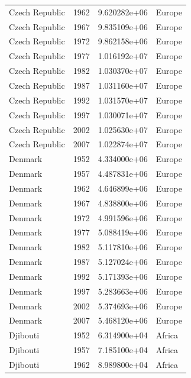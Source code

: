\documentclass[
  letterpaper,
  DIV=11,
  numbers=noendperiod]{scrreprt}
\begin{document}
\begin{tcolorbox}
\begin{tabular}{lrrl}
Czech Republic           &  1962 &  9.620282e+06 &    Europe \\
Czech Republic           &  1967 &  9.835109e+06 &    Europe \\
Czech Republic           &  1972 &  9.862158e+06 &    Europe \\
Czech Republic           &  1977 &  1.016192e+07 &    Europe \\
Czech Republic           &  1982 &  1.030370e+07 &    Europe \\
Czech Republic           &  1987 &  1.031160e+07 &    Europe \\
Czech Republic           &  1992 &  1.031570e+07 &    Europe \\
Czech Republic           &  1997 &  1.030071e+07 &    Europe \\
Czech Republic           &  2002 &  1.025630e+07 &    Europe \\
Czech Republic           &  2007 &  1.022874e+07 &    Europe \\
Denmark                  &  1952 &  4.334000e+06 &    Europe \\
Denmark                  &  1957 &  4.487831e+06 &    Europe \\
Denmark                  &  1962 &  4.646899e+06 &    Europe \\
Denmark                  &  1967 &  4.838800e+06 &    Europe \\
Denmark                  &  1972 &  4.991596e+06 &    Europe \\
Denmark                  &  1977 &  5.088419e+06 &    Europe \\
Denmark                  &  1982 &  5.117810e+06 &    Europe \\
Denmark                  &  1987 &  5.127024e+06 &    Europe \\
Denmark                  &  1992 &  5.171393e+06 &    Europe \\
Denmark                  &  1997 &  5.283663e+06 &    Europe \\
Denmark                  &  2002 &  5.374693e+06 &    Europe \\
Denmark                  &  2007 &  5.468120e+06 &    Europe \\
Djibouti                 &  1952 &  6.314900e+04 &    Africa \\
Djibouti                 &  1957 &  7.185100e+04 &    Africa \\
Djibouti                 &  1962 &  8.989800e+04 &    Africa \\

\end{tabular}
\end{tcolorbox}
\end{document}
